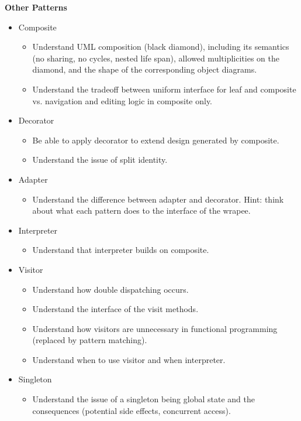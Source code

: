 \documentclass{article}
\begin{document}
\textbf{Other Patterns}
\begin{itemize}
    \item Composite
    \begin{itemize}
        \item Understand UML composition (black diamond), including its semantics (no sharing, no cycles, nested life span), allowed multiplicities on the diamond, and the shape of the corresponding object diagrams.
        \item Understand the tradeoff between uniform interface for leaf and composite vs. navigation and editing logic in composite only.
    \end{itemize}
    \item Decorator
    \begin{itemize}
        \item Be able to apply decorator to extend design generated by composite.
        \item Understand the issue of split identity.
    \end{itemize}
    \item Adapter
    \begin{itemize}
        \item Understand the difference between adapter and decorator. Hint: think about what each pattern does to the interface of the wrapee.
    \end{itemize}
    \item Interpreter
    \begin{itemize}
        \item Understand that interpreter builds on composite.
    \end{itemize}
    \item Visitor
    \begin{itemize}
        \item Understand how double dispatching occurs.
        \item Understand the interface of the visit methods.
        \item Understand how visitors are unnecessary in functional programming (replaced by pattern matching).
        \item Understand when to use visitor and when interpreter.
    \end{itemize}
    \item Singleton
    \begin{itemize}
        \item Understand the issue of a singleton being global state and the consequences (potential side effects, concurrent access).

\end{itemize}
\end{itemize}
\end{document}
